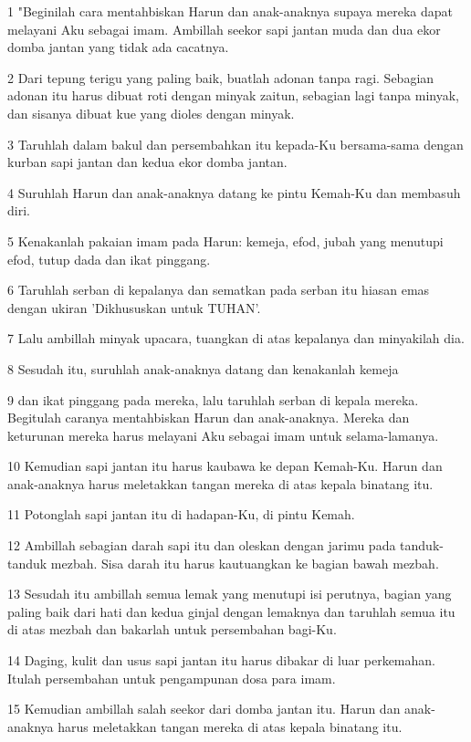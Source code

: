 \par 1 "Beginilah cara mentahbiskan Harun dan anak-anaknya supaya mereka dapat melayani Aku sebagai imam. Ambillah seekor sapi jantan muda dan dua ekor domba jantan yang tidak ada cacatnya.
\par 2 Dari tepung terigu yang paling baik, buatlah adonan tanpa ragi. Sebagian adonan itu harus dibuat roti dengan minyak zaitun, sebagian lagi tanpa minyak, dan sisanya dibuat kue yang dioles dengan minyak.
\par 3 Taruhlah dalam bakul dan persembahkan itu kepada-Ku bersama-sama dengan kurban sapi jantan dan kedua ekor domba jantan.
\par 4 Suruhlah Harun dan anak-anaknya datang ke pintu Kemah-Ku dan membasuh diri.
\par 5 Kenakanlah pakaian imam pada Harun: kemeja, efod, jubah yang menutupi efod, tutup dada dan ikat pinggang.
\par 6 Taruhlah serban di kepalanya dan sematkan pada serban itu hiasan emas dengan ukiran 'Dikhususkan untuk TUHAN'.
\par 7 Lalu ambillah minyak upacara, tuangkan di atas kepalanya dan minyakilah dia.
\par 8 Sesudah itu, suruhlah anak-anaknya datang dan kenakanlah kemeja
\par 9 dan ikat pinggang pada mereka, lalu taruhlah serban di kepala mereka. Begitulah caranya mentahbiskan Harun dan anak-anaknya. Mereka dan keturunan mereka harus melayani Aku sebagai imam untuk selama-lamanya.
\par 10 Kemudian sapi jantan itu harus kaubawa ke depan Kemah-Ku. Harun dan anak-anaknya harus meletakkan tangan mereka di atas kepala binatang itu.
\par 11 Potonglah sapi jantan itu di hadapan-Ku, di pintu Kemah.
\par 12 Ambillah sebagian darah sapi itu dan oleskan dengan jarimu pada tanduk-tanduk mezbah. Sisa darah itu harus kautuangkan ke bagian bawah mezbah.
\par 13 Sesudah itu ambillah semua lemak yang menutupi isi perutnya, bagian yang paling baik dari hati dan kedua ginjal dengan lemaknya dan taruhlah semua itu di atas mezbah dan bakarlah untuk persembahan bagi-Ku.
\par 14 Daging, kulit dan usus sapi jantan itu harus dibakar di luar perkemahan. Itulah persembahan untuk pengampunan dosa para imam.
\par 15 Kemudian ambillah salah seekor dari domba jantan itu. Harun dan anak-anaknya harus meletakkan tangan mereka di atas kepala binatang itu.
